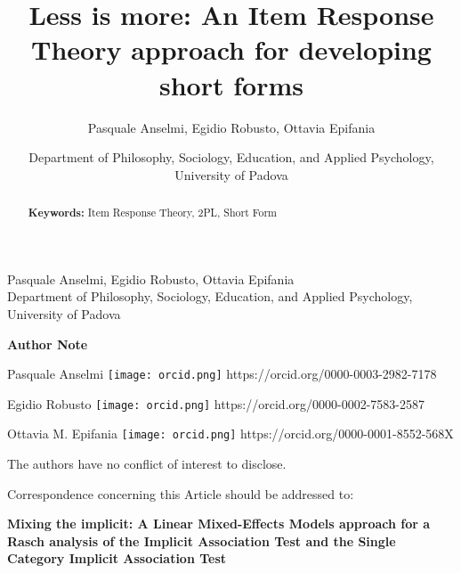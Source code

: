 \documentclass[12pt, a4paper, titilepage]{article}
\title{Less is more: An Item Response Theory approach for developing short forms}
\author{Pasquale Anselmi, Egidio Robusto, Ottavia Epifania}
\date{
%
Department of Philosophy, Sociology, Education, and Applied Psychology, University of Padova
}
\begin{document}
%
\vspace*{10mm}
\begin{center}
	\begin{LARGE}

	\end{LARGE}
	
	\vspace{5mm}
	\begin{large}
		Pasquale Anselmi, Egidio Robusto, Ottavia Epifania \\ 
		Department of Philosophy, Sociology, Education, and Applied Psychology, University of Padova
	\end{large}
\end{center}
\vspace{15mm}
\begin{center}
	\textbf{Author Note}
\end{center}
\begin{small}

Pasquale Anselmi \texttt{[image: orcid.png]} https://orcid.org/0000-0003-2982-7178 


Egidio Robusto \texttt{[image: orcid.png]} https://orcid.org/0000-0002-7583-2587

Ottavia M. Epifania \texttt{[image: orcid.png]} https://orcid.org/0000-0001-8552-568X

The authors have no conflict of interest to disclose.

Correspondence concerning this Article should be addressed to: %
\end{small}


\vfill


\newpage



\begin{abstract}
	

\textbf{Keywords:}  Item Response Theory, 2PL, Short Form
\end{abstract}

\newpage
\begin{center}
\textbf{Mixing the implicit: A Linear Mixed-Effects Models approach for a Rasch analysis of the Implicit Association Test and the Single Category Implicit Association Test}
\end{center}
\end{document}
